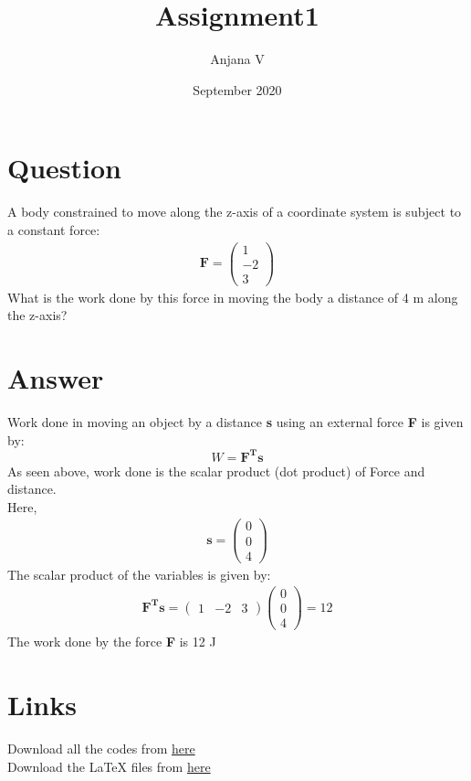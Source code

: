 \documentclass{article}
\title{Assignment1}
\author{Anjana V }
\date{September 2020}
\begin{document}
\newcommand{\myvec}[1]{\ensuremath{\begin{pmatrix}#1\end{pmatrix}}}
\maketitle
\section*{Question}
A body constrained to move along the z-axis of a coordinate system is subject to a constant force:
\begin{align}
\textbf{F}=\myvec{1\\-2\\3}    
\end{align}
What is the work done by this force in moving the body a distance of 4 m along the z-axis?
\section*{Answer}
Work done in moving an object by a distance \textbf{s} using an external force \textbf{F} is given by:
$$W = \mathbf{F^Ts}$$
As seen above, work done is the scalar product (dot product) of Force and distance.
\\Here, 
\begin{align}
\textbf{s}=\myvec{0\\0\\4}   
\end{align}
The scalar product of the variables is given by:
\begin{align}
\mathbf{F^Ts} = \myvec{1 & -2 & 3} \myvec{0\\0\\4} = 12
\end{align}
The work done by the force \textbf{F} is 12 J
\section*{Links}
Download all the codes from \href{https://github.com/anjanavasudevan/grad_schoolwork/blob/master/EE5609/Assignment1/assignment.py}{here} 
\\Download the LaTeX files from \href{https://github.com/anjanavasudevan/grad_schoolwork/tree/master/EE5609/Assignment1/latex}{here}
\end{document}
